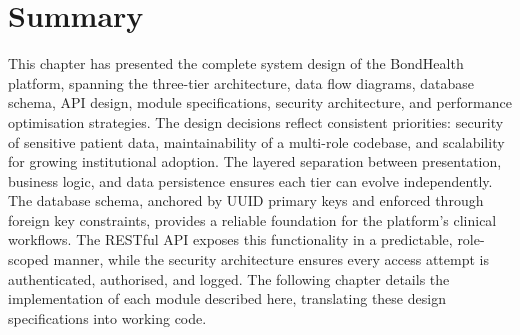 
\section{Summary}

This chapter has presented the complete system design of the BondHealth platform,
spanning the three-tier architecture, data flow diagrams, database schema, API design,
module specifications, security architecture, and performance optimisation strategies.
The design decisions reflect consistent priorities: security of sensitive patient data,
maintainability of a multi-role codebase, and scalability for growing institutional
adoption. The layered separation between presentation, business logic, and data persistence
ensures each tier can evolve independently. The database schema, anchored by UUID primary
keys and enforced through foreign key constraints, provides a reliable foundation for the
platform's clinical workflows. The RESTful API exposes this functionality in a predictable,
role-scoped manner, while the security architecture ensures every access attempt is
authenticated, authorised, and logged. The following chapter details the implementation of
each module described here, translating these design specifications into working code.